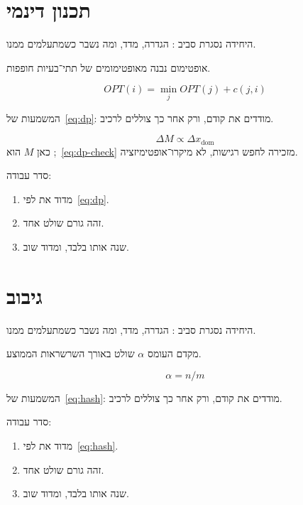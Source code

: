 \chapter{תכנון דינמי}
\label{ch:dp}

היחידה נסגרת סביב : הגדרה, מדד, ומה נשבר כשמתעלמים ממנו.

\begin{keybox}[frametitle={רעיון מפתח — תכנון דינמי}]
אופטימום נבנה מאופטימומים של תתי־בעיות חופפות.
\end{keybox}

\begin{equation}
\label{eq:dp}
OPT(i)=\min_j OPT(j)+c(j,i)
\end{equation}

המשמעות של~\eqref{eq:dp}: מודדים את  קודם, ורק אחר כך צוללים לרכיב.

\begin{equation}
\label{eq:dp-check}
\Delta M \propto \Delta x_{\mathrm{dom}}
\end{equation}
כאן $M$ הוא ;~\eqref{eq:dp-check} מזכירה לחפש רגישות, לא מיקרו־אופטימיזציה.

סדר עבודה:
\begin{enumerate}
\item[(\textbf{א})] מדוד את  לפי~\eqref{eq:dp}.
\item[(\textbf{ב})] זהה גורם שולט אחד.
\item[(\textbf{ג})] שנה אותו בלבד, ומדוד שוב.
\end{enumerate}

\chapter{גיבוב}
\label{ch:hash}

היחידה נסגרת סביב : הגדרה, מדד, ומה נשבר כשמתעלמים ממנו.

\begin{defbox}[frametitle={הגדרה — גיבוב}]
מקדם העומס $\alpha$ שולט באורך השרשראות הממוצע.
\end{defbox}

\begin{equation}
\label{eq:hash}
\alpha = n/m
\end{equation}

המשמעות של~\eqref{eq:hash}: מודדים את  קודם, ורק אחר כך צוללים לרכיב.

סדר עבודה:
\begin{enumerate}
\item[(\textbf{א})] מדוד את  לפי~\eqref{eq:hash}.
\item[(\textbf{ב})] זהה גורם שולט אחד.
\item[(\textbf{ג})] שנה אותו בלבד, ומדוד שוב.
\end{enumerate}

